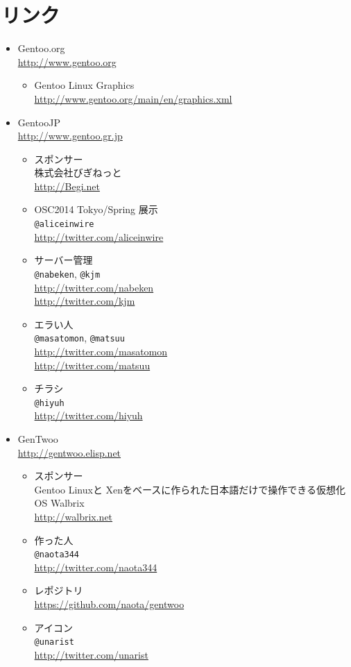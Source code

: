 \documentclass[10pt,foldmark,notumble]{leaflet}
\begin{document}
\section{リンク}
\begin{itemize}
	\item Gentoo.org \\
		\url{http://www.gentoo.org}
		\begin{itemize}
			\item Gentoo Linux Graphics \\
				\url{http://www.gentoo.org/main/en/graphics.xml}
		\end{itemize}
	\item GentooJP \\
		\url{http://www.gentoo.gr.jp}
		\begin{itemize}
			\item スポンサー \\
				株式会社びぎねっと \\
				\url{http://Begi.net}
			\item OSC2014 Tokyo/Spring 展示 \\
				\verb|@aliceinwire| \\
				\url{http://twitter.com/aliceinwire}
			\item サーバー管理 \\
				\verb|@nabeken|, \verb|@kjm| \\
				\url{http://twitter.com/nabeken} \\
				\url{http://twitter.com/kjm}
			\item エラい人 \\
				\verb|@masatomon|, \verb|@matsuu| \\
				\url{http://twitter.com/masatomon} \\
				\url{http://twitter.com/matsuu}
			\item チラシ \\
				\verb|@hiyuh| \\
				\url{http://twitter.com/hiyuh}
		\end{itemize}
	\item GenTwoo \\
		\url{http://gentwoo.elisp.net}
		\begin{itemize}
			\item スポンサー \\
				Gentoo Linuxと Xenをベースに作られた日本語だけで操作できる仮想化OS Walbrix \\
				\url{http://walbrix.net}
			\item 作った人 \\
				\verb|@naota344| \\
				\url{http://twitter.com/naota344}
			\item レポジトリ \\
				\url{https://github.com/naota/gentwoo}
			\item アイコン \\
				\verb|@unarist| \\
				\url{http://twitter.com/unarist}
		\end{itemize}
\end{itemize}
\end{document}
